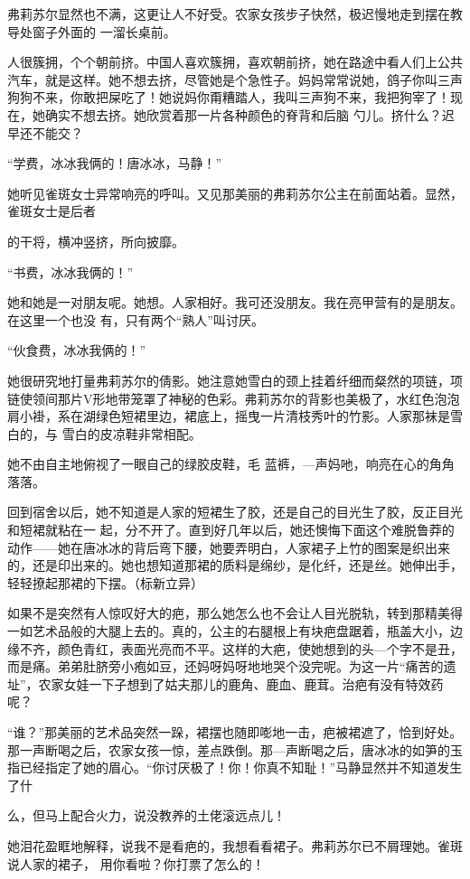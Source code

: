 \documentclass{article}
\begin{document}
弗莉苏尔显然也不满，这更让人不好受。农家女孩步子快然，极迟慢地走到摆在教导处窗子外面的
一溜长桌前。 

人很簇拥，个个朝前挤。中国人喜欢簇拥，喜欢朝前挤，她在路途中看人们上公共汽车，就是这样。她不想去挤，尽管她是个急性子。妈妈常常说她，鸽子你叫三声狗狗不来，你敢把屎吃了！她说妈你甭糟踏人，我叫三声狗不来，我把狗宰了！现在，她确实不想去挤。她欣赏着那一片各种颜色的脊背和后脑
勺儿。挤什么？迟早还不能交？ 


“学费，冰冰我俩的！唐冰冰，马静！” 

她听见雀斑女士异常响亮的呼叫。又见那美丽的弗莉苏尔公主在前面站着。显然，雀斑女士是后者

\newpage
的干将，横冲竖挤，所向披靡。 


“书费，冰冰我俩的！” 

她和她是一对朋友呢。她想。人家相好。我可还没朋友。我在亮甲营有的是朋友。在这里一个也没
有，只有两个“熟人”叫讨厌。 


“伙食费，冰冰我俩的！” 

她很研究地打量弗莉苏尔的倩影。她注意她雪白的颈上挂着纤细而粲然的项链，项链使领间那片V形地带笼罩了神秘的色彩。弗莉苏尔的背影也美极了，水红色泡泡肩小褂，系在湖绿色短裙里边，裙底上，摇曳一片清枝秀叶的竹影。人家那袜是雪白的，与
雪白的皮凉鞋非常相配。 

她不由自主地俯视了一眼自己的绿胶皮鞋，毛
蓝裤，—声妈吔，响亮在心的角角落落。 

回到宿舍以后，她不知道是人家的短裙生了胶，还是自己的目光生了胶，反正目光和短裙就粘在一
\newpage
起，分不开了。直到好几年以后，她还懊悔下面这个难脱鲁莽的动作——她在唐冰冰的背后弯下腰，她要弄明白，人家裙子上竹的图案是织出来的，还是印出来的。她也想知道那裙的质料是绵纱，是化纤，还是丝。她伸出手，轻轻撩起那裙的下摆。（标新立异）

如果不是突然有人惊叹好大的疤，那么她怎么也不会让人目光脱轨，转到那精美得一如艺术品般的大腿上去的。真的，公主的右腿根上有块疤盘踞着，瓶盖大小，边缘不齐，颜色青红，表面光亮而不平。这样的大疤，使她想到的头—个字不是丑，而是痛。弟弟肚脐旁小疱如豆，还妈呀妈呀地地哭个没完呢。为这一片“痛苦的遗址”，农家女娃一下子想到了姑夫那儿的鹿角、鹿血、鹿茸。治疤有没有特效药呢？

“谁？”那美丽的艺术品突然一跺，裙摆也随即嘭地一击，疤被裙遮了，恰到好处。那一声断喝之后，农家女孩一惊，差点跌倒。那—声断喝之后，唐冰冰的如笋的玉指已经指定了她的眉心。“你讨厌极了！你！你真不知耻！”马静显然并不知道发生了什

\newpage
么，但马上配合火力，说没教养的土佬滚远点儿！ 

她泪花盈眶地解释，说我不是看疤的，我想看看裙子。弗莉苏尔已不屑理她。雀斑说人家的裙子，
用你看啦？你打票了怎么的！ 
\end{document}
